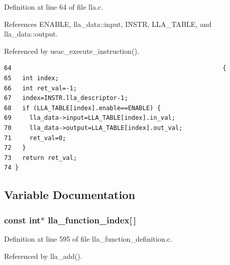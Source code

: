 Definition at line 64 of file lla.c.

References ENABLE, lla\_\-data::input, INSTR, LLA\_\-TABLE, and lla\_\-data::output.

Referenced by ueac\_\-execute\_\-instruction().

\footnotesize\begin{verbatim}64                                                          {
65   int index;
66   int ret_val=-1;
67   index=INSTR.lla_descriptor-1;
68   if (LLA_TABLE[index].enable==ENABLE) {
69     lla_data->input=LLA_TABLE[index].in_val;
70     lla_data->output=LLA_TABLE[index].out_val;
71     ret_val=0;
72   }
73   return ret_val;
74 }
\end{verbatim}\normalsize 




\subsection{Variable Documentation}
\subsubsection{\setlength{\rightskip}{0pt plus 5cm}const int$\ast$ {\bf lla\_\-function\_\-index}[$\,$]}\label{lla_8h_a2}




Definition at line 595 of file lla\_\-function\_\-definition.c.

Referenced by lla\_\-add().